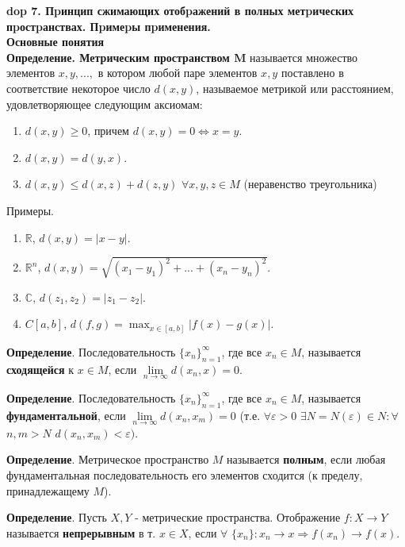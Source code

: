 \setcounter{section}{4}
\setcounter{subsection}{7}
\setcounter{equation}{0}
\textbf{\LARGE dop 7. Пpинцип сжимающих отобpажений в полных метpических пpостpанствах. Пpимеpы пpименения.}  \\
\textbf{\large Основные понятия} \\
\textbf{Определение. Метрическим пространством M}
называется множество элементов $x, y, ...,$ в котором любой паре элементов $x, y$ поставлено в соответствие некоторое число $d(x, y)$, называемое метрикой или расстоянием, удовлетворяющее следующим аксиомам:
\begin{enumerate}
    \item $d(x, y) \geq 0$, причем $d(x, y)=0 \iff x=y$.
    \item $d(x, y) = d(y, x)$.
    \item $d(x, y) \leq d(x, z) + d(z, y)$ $\forall x,y,z \in M$ (неравенство треугольника)
\end{enumerate}

Примеры.
\begin{enumerate}
    \item $\mathbb{R}$, $d(x,y)=|x-y|$.
    \item $\mathbb{R}^n$, $d(x, y) = \sqrt{(x_1-y_1)^2+...+(x_n-y_n)^2}$.
    \item $\mathbb{C}$, $d(z_1, z_2) = |z_1-z_2|$.
    \item $C[a,b]$, $d(f, g) = \max_{x \in [a,b]}|f(x)-g(x)|$.
\end{enumerate}

\textbf{Определение}. Последовательность $\{x_n\}_{n=1}^{\infty}$, где все $x_n \in M$, называется \textbf{сходящейся} к $x \in M$, если $\lim\limits_{n \to \infty} d(x_n, x) = 0$.

\textbf{Определение}. Последовательность $\{x_n\}_{n=1}^{\infty}$, где все $x_n \in M$, называется \textbf{фундаментальной}, если $\lim\limits_{n \to \infty} d(x_n, x_m) = 0$ (т.е. $\forall \varepsilon > 0$ $\exists N = N(\varepsilon) \in N: \forall$ $n,m > N$ $d(x_n, x_m) < \varepsilon)$.

\textbf{Определение}. Метрическое пространство $M$ называется \textbf{полным}, если любая фундаментальная последовательность его элементов сходится (к пределу, принадлежащему $M$).

\textbf{Определение}. Пусть $X, Y$ - метрические пространства. Отображение $f : X \xrightarrow{} Y$ называется
\textbf{непрерывным} в т. $x \in X$, если $\forall$ $ \{x_n\}:x_n \rightarrow x \Rightarrow f(x_n) \xrightarrow{} f(x)$.


